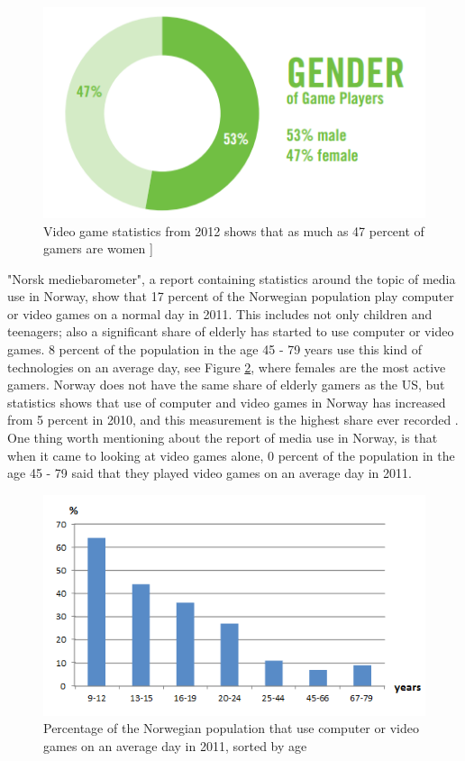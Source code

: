 \begin{figure}
\begin{center}
\includegraphics[scale=0.7]{gendergameplayers}
\caption[Gender of gameplayer]{Video game statistics from 2012 shows that as much as 47 percent of gamers are women \cite{statistics2012real}]}
\label{fig:GenderGamePlayers}
\end{center}
\end{figure}
"Norsk mediebarometer", a report containing statistics around the topic of media use in Norway, show that 17 percent of the Norwegian population play computer or video games on a normal day in 2011. This includes not only children and teenagers; also a significant share of elderly has started to use computer or video games. 8 percent of the population in the age 45 - 79 years use this kind of technologies on an average day, see Figure \ref{fig:GameStatisticsNorway}, where females are the most active gamers. Norway does not have the same share of elderly gamers as the US, but statistics shows that use of computer and video games in Norway has increased from 5 percent in 2010, and this measurement is the highest share ever recorded \cite{ssb2010} \cite{ssb2011}. One thing worth mentioning about the report of media use in Norway, is that when it came to looking at video games alone, 0 percent of the population in the age 45 - 79 said that they played video games on an average day in 2011. \cite{ssb2011}
\begin{figure}
\begin{center}
\includegraphics[scale=0.9]{gamestatisticsnorway}
\caption[Use of computer or video games, Norway, 2011]{Percentage of the Norwegian population that use computer or video games on an average day in 2011, sorted by age \cite{ssb2011}}
\label{fig:GameStatisticsNorway}
\end{center}
\end{figure}
       
